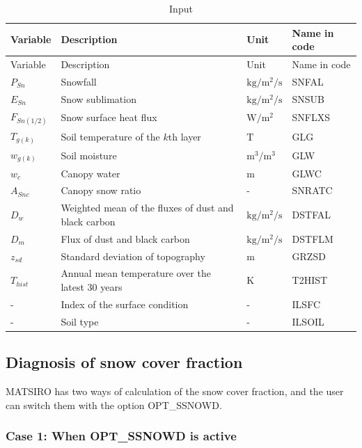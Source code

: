 \begin{longtable}[]{@{}llll@{}}
\caption{Input}\tabularnewline
\toprule\noalign{}
Variable & Description & Unit & Name in code \\
\midrule\noalign{}
\endfirsthead
\toprule\noalign{}
Variable & Description & Unit & Name in code \\
\midrule\noalign{}
\endhead
\bottomrule\noalign{}
\endlastfoot
\(P_{Sn}\) & Snowfall & \(\mathrm{kg/m^2/s}\) & SNFAL \\
\(E_{Sn}\) & Snow sublimation & \(\mathrm{kg/m^2/s}\) & SNSUB \\
\(F_{Sn(1/2)}\) & Snow surface heat flux & \(\mathrm{W/m^2}\) & SNFLXS \\
\(T_{g(k)}\) & Soil temperature of the \(k\)th layer & \(\mathrm{T}\) & GLG \\
\(w_{g(k)}\) & Soil moisture & \(\mathrm{m^3/m^3}\) & GLW \\
\(w_c\) & Canopy water & \(\mathrm{m}\) & GLWC \\
\(A_{Snc}\) & Canopy snow ratio & - & SNRATC \\
\(D_w\) & Weighted mean of the fluxes of dust and black carbon & \(\mathrm{kg/m^2/s}\) & DSTFAL \\
\(D_m\) & Flux of dust and black carbon & \(\mathrm{kg/m^2/s}\) & DSTFLM \\
\(z_{sd}\) & Standard deviation of topography & \(\mathrm{m}\) & GRZSD \\
\(T_{hist}\) & Annual mean temperature over the latest 30 years & \(\mathrm{K}\) & T2HIST \\
- & Index of the surface condition & - & ILSFC \\
- & Soil type & - & ILSOIL \\
\end{longtable}

\subsection{Diagnosis of snow cover fraction}\label{diagnosis-of-snow-cover-fraction}

MATSIRO has two ways of calculation of the snow cover fraction, and the user can switch them with the option OPT\_SSNOWD.

\subsubsection{Case 1: When OPT\_SSNOWD is active}\label{case-1-when-opt_ssnowd-is-active}

